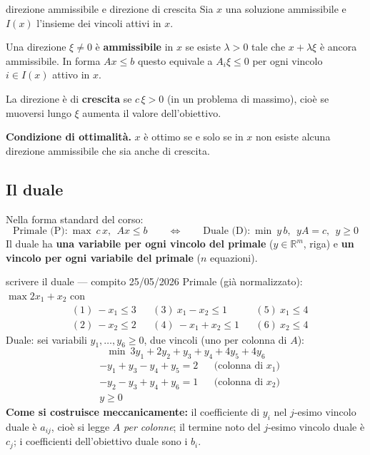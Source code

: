 \documentclass[11pt,a4paper]{article}
\begin{document}
\begin{teo}{direzione ammissibile e direzione di crescita}
Sia $x$ una soluzione ammissibile e $I(x)$ l'insieme dei vincoli attivi in $x$.

Una direzione $\xi \ne 0$ è \textbf{ammissibile} in $x$ se esiste $\lambda > 0$ tale che
$x + \lambda \xi$ è ancora ammissibile. In forma $Ax\le b$ questo equivale a
$A_i \xi \le 0$ per ogni vincolo $i \in I(x)$ attivo in $x$.

La direzione è di \textbf{crescita} se $c\,\xi > 0$ (in un problema di massimo),
cioè se muoversi lungo $\xi$ aumenta il valore dell'obiettivo.

\textbf{Condizione di ottimalità.} $x$ è ottimo se e solo se in $x$ non esiste alcuna
direzione ammissibile che sia anche di crescita.
\end{teo}

\newpage
\subsection{Il duale}

Nella forma standard del corso:
\[
\text{Primale (P):} \ \max\ c\,x, \ \ A x \le b
\qquad\Longleftrightarrow\qquad
\text{Duale (D):} \ \min\ y\,b, \ \ y A = c, \ \ y \ge 0
\]
Il duale ha \textbf{una variabile per ogni vincolo del primale} ($y \in \mathbb{R}^m$, riga)
e \textbf{un vincolo per ogni variabile del primale} ($n$ equazioni).

\begin{es}{scrivere il duale --- compito 25/05/2026}
Primale (già normalizzato): $\max 2x_1 + x_2$ con
\[
\begin{aligned}
&(1)\ -x_1 \le 3 &&(3)\ x_1 - x_2 \le 1 &&(5)\ x_1 \le 4\\
&(2)\ -x_2 \le 2 &&(4)\ -x_1 + x_2 \le 1 &&(6)\ x_2 \le 4
\end{aligned}
\]
Duale: sei variabili $y_1,\dots,y_6 \ge 0$, due vincoli (uno per colonna di $A$):
\[
\min\ 3y_1 + 2y_2 + y_3 + y_4 + 4y_5 + 4y_6
\]
\[
\begin{aligned}
&-y_1 + y_3 - y_4 + y_5 = 2 &&\text{(colonna di } x_1)\\
&-y_2 - y_3 + y_4 + y_6 = 1 &&\text{(colonna di } x_2)\\
&y \ge 0
\end{aligned}
\]
\textbf{Come si costruisce meccanicamente:} il coefficiente di $y_i$ nel $j$-esimo vincolo duale
è $a_{ij}$, cioè si legge $A$ \emph{per colonne}; il termine noto del $j$-esimo vincolo duale è $c_j$;
i coefficienti dell'obiettivo duale sono i $b_i$.
\end{es}
\end{document}
